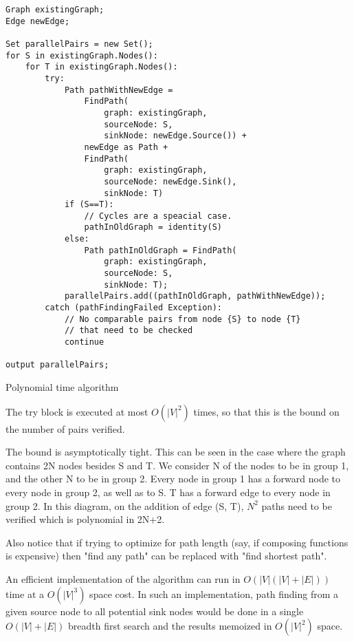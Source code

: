 \documentclass[sigplan,review,anonymous]{acmart}
\begin{document}
\begin{verbatim}
Graph existingGraph;
Edge newEdge;

Set parallelPairs = new Set();
for S in existingGraph.Nodes():
    for T in existingGraph.Nodes():
        try:
            Path pathWithNewEdge = 
                FindPath(
                    graph: existingGraph, 
                    sourceNode: S,
                    sinkNode: newEdge.Source()) +
                newEdge as Path +
                FindPath(
                    graph: existingGraph, 
                    sourceNode: newEdge.Sink(), 
                    sinkNode: T)
            if (S==T):
                // Cycles are a speacial case.
                pathInOldGraph = identity(S)
            else:
                Path pathInOldGraph = FindPath(
                    graph: existingGraph, 
                    sourceNode: S, 
                    sinkNode: T);
            parallelPairs.add((pathInOldGraph, pathWithNewEdge));
        catch (pathFindingFailed Exception):
            // No comparable pairs from node {S} to node {T} 
            // that need to be checked
            continue

output parallelPairs;
\end{verbatim}
\begin{algorithm}
    \caption{Polynomial time algorithm}
    \label{polynomial}
\end{algorithm}

The try block is executed at most $O(|V|^2)$ times, so that this is the bound on the number of pairs verified.

The bound is asymptotically tight. This can be seen in the case where the graph contains 2N nodes besides S and T. We consider N of the nodes to be in group 1, and the other N to be in group 2. Every node in group 1 has a forward node to every node in group 2, as well as to S. T has a forward edge to every node in group 2. In this diagram, on the addition of edge (S, T), $N^2$ paths need to be verified which is polynomial in 2N+2.

Also notice that if trying to optimize for path length (say, if composing functions is expensive) then "find any path" can be replaced with "find shortest path".

An efficient implementation of the algorithm can run in $O(|V|(|V|+|E|))$ time at a $O(|V|^3)$ space cost. In such an implementation, path finding from a given source node to all potential sink nodes would be done in a single $O(|V|+|E|)$ breadth first search and the results memoized in $O(|V|^2)$ space.
\end{document}
